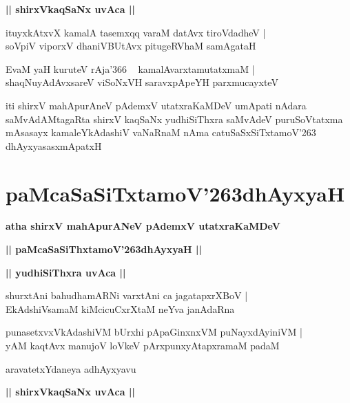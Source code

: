 \documentclass[twoside,12pt,openright]{book}
\def\S{\char'263}
\newcounter{shloka}[chapter]
\def\uvaca#1{\centerline{{\large\textbf{#1}}}}
\begin{document}
\uvaca{|| shirxVkaqSaNx uvAca ||}

\begin{shloka}%
ituyxkAtxvX kamalA tasemxqq varaM datAvx tiroVdadheV |\\
soVpiV viporxV dhaniVBUtAvx pitugeRVhaM samAgataH 
\end{shloka}

\begin{shloka}%
EvaM yaH kuruteV rAja\char'366 ~ kamalAvarxtamutatxmaM |\\
shaqNuyAdAvxsareV viSoNxVH saravxpApeYH parxmucayxteV
\end{shloka}

\begin{center}
iti shirxV mahApurAneV pAdemxV utatxraKaMDeV umApati nAdara saMvAdAMtagaRta shirxV kaqSaNx 
yudhiSiThxra saMvAdeV puruSoVtatxma mAsasayx kamaleYkAdashiV vaNaRnaM nAma catuSaSxSiTxtamoV\S
dhAyxyasasxmApatxH
\end{center}

\chapter{paMcaSaSiTxtamoV\S dhAyxyaH}

\begin{center}
{\LARGE\bfseries atha shirxV mahApurANeV pAdemxV utatxraKaMDeV}
\end{center}

\begin{center}
{\LARGE\bfseries || paMcaSaSiThxtamoV\S dhAyxyaH ||}
\end{center}

\uvaca{|| yudhiSiThxra uvAca ||}

\begin{shloka}%
shurxtAni bahudhamARNi varxtAni ca jagatapxrXBoV |\\
EkAdshiVsamaM kiMcicuCxrXtaM neYva janAdaRna
\end{shloka}

\begin{shloka}%
punasetxvxVkAdashiVM bUrxhi pApaGinxnxVM puNayxdAyiniVM |\\
yAM kaqtAvx manujoV loVkeV pArxpunxyAtapxramaM padaM 
\end{shloka}

\begin{center}
aravatetxYdaneya adhAyxyavu
\end{center}

\uvaca{|| shirxVkaqSaNx uvAca ||}
\end{document}
